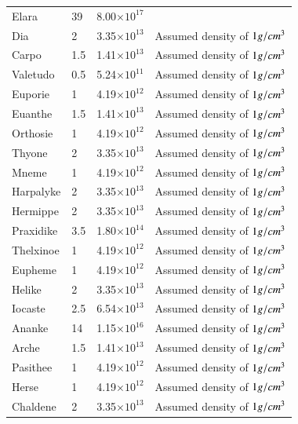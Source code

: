 \documentclass{aa}
\begin{document}
\begin{appendix}
\begin{table}[!ht]
\begin{tabular}{llll}
        Elara & 39 & 8.00$\times 10^{17 }$ & \cite{Williams_NSSDCA_JovianFact} \\ 
        Dia & 2 & 3.35$\times 10^{13 }$ & Assumed density of $1 \space g/cm^3$ \\ 
        Carpo & 1.5 & 1.41$\times 10^{13 }$ & Assumed density of $1 \space g/cm^3$ \\ 
        Valetudo & 0.5 & 5.24$\times 10^{11 }$ & Assumed density of $1 \space g/cm^3$ \\ 
        Euporie & 1 & 4.19$\times 10^{12 }$ & Assumed density of $1 \space g/cm^3$ \\ 
        Euanthe & 1.5 & 1.41$\times 10^{13 }$ & Assumed density of $1 \space g/cm^3$ \\ 
        Orthosie & 1 & 4.19$\times 10^{12 }$ & Assumed density of $1 \space g/cm^3$ \\ 
        Thyone & 2 & 3.35$\times 10^{13 }$ & Assumed density of $1 \space g/cm^3$ \\ 
        Mneme & 1 & 4.19$\times 10^{12 }$ & Assumed density of $1 \space g/cm^3$ \\ 
        Harpalyke & 2 & 3.35$\times 10^{13 }$ & Assumed density of $1 \space g/cm^3$ \\ 
        Hermippe & 2 & 3.35$\times 10^{13 }$ & Assumed density of $1 \space g/cm^3$ \\ 
        Praxidike & 3.5 & 1.80$\times 10^{14 }$ & Assumed density of $1 \space g/cm^3$ \\ 
        Thelxinoe & 1 & 4.19$\times 10^{12 }$ & Assumed density of $1 \space g/cm^3$ \\ 
        Eupheme & 1 & 4.19$\times 10^{12 }$ & Assumed density of $1 \space g/cm^3$ \\ 
        Helike & 2 & 3.35$\times 10^{13 }$ & Assumed density of $1 \space g/cm^3$ \\ 
        Iocaste & 2.5 & 6.54$\times 10^{13 }$ & Assumed density of $1 \space g/cm^3$ \\ 
        Ananke & 14 & 1.15$\times 10^{16 }$ & Assumed density of $1 \space g/cm^3$ \\ 
        Arche & 1.5 & 1.41$\times 10^{13 }$ & Assumed density of $1 \space g/cm^3$ \\ 
        Pasithee & 1 & 4.19$\times 10^{12 }$ & Assumed density of $1 \space g/cm^3$ \\ 
        Herse & 1 & 4.19$\times 10^{12 }$ & Assumed density of $1 \space g/cm^3$ \\ 
        Chaldene & 2 & 3.35$\times 10^{13 }$ & Assumed density of $1 \space g/cm^3$ \\ 

\end{tabular}
\end{table}
\end{appendix}
\end{document}
